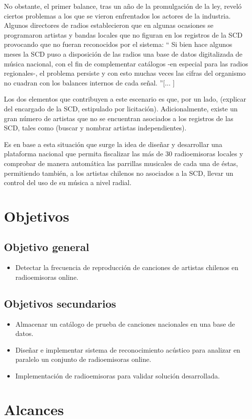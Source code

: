 No obstante, el primer balance, tras un año de la promulgación de la ley, reveló ciertos problemas a los que se vieron enfrentados los actores de la industria. Algunos directores de radios establecieron que en algunas ocasiones se programaron artistas y bandas locales que no figuran en los registros de la SCD provocando que no fueran reconocidos por el sistema: “ Si bien hace algunos meses la SCD puso a disposición de las radios una base de datos digitalizada de música nacional, con el fin de complementar catálogos -en especial para las radios regionales-, el problema persiste y con esto muchas veces las cifras del organismo no cuadran con los balances internos de cada señal.   ”[... ]

\bigskip

Los dos elementos que contribuyen a este escenario es que, por un lado, (explicar del encargado de la SCD, estipulado por licitación). Adicionalmente, existe un gran número de artistas que no se encuentran asociados a los registros de las SCD, tales como (buscar y nombrar artistas independientes).

\bigskip

Es en base a esta situación que surge la idea de diseñar y desarrollar una plataforma nacional que permita fiscalizar las más de 30 radioemisoras locales y comprobar de manera automática las parrillas musicales de cada una de éstas, permitiendo también, a los artistas chilenos no asociados a la SCD, llevar un control del uso de su música a nivel radial.


\section{Objetivos}

\subsection{Objetivo general}
\begin{itemize}
\item Detectar la frecuencia de reproducción de canciones de artistas chilenos en radioemisoras online.
\end{itemize}

\subsection{Objetivos secundarios}
\begin{itemize}
\item Almacenar un catálogo de prueba de canciones nacionales en una base de datos.
\item Diseñar e implementar sistema de reconocimiento acústico para analizar en paralelo un conjunto de radioemisoras online.
\item Implementación de radioemisoras para validar solución desarrollada.
\end{itemize}
\section{Alcances}
\lipsum[1-2]